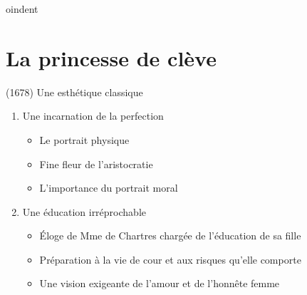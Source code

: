 \documentclass[12pt,a4paper]{article}
\begin{document}
oindent\hrulefill

\section*{La princesse de clève}
	(1678) Une esthétique classique
\begin{enumerate}
   \item Une incarnation de la perfection
   \begin{itemize}
     \item Le portrait physique
     \item Fine fleur de l'aristocratie
     \item L'importance du portrait moral
   \end{itemize}
   \item Une éducation irréprochable
   \begin{itemize}
       \item Éloge de Mme de Chartres chargée de l'éducation de sa fille
       \item Préparation à la vie de cour et aux risques qu'elle comporte
       \item Une vision exigeante de l'amour et de l'honnête femme
    \end{itemize}
\end{enumerate}
\end{document}
